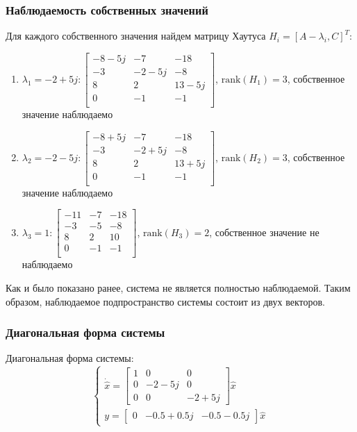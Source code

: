 \subsubsection{Наблюдаемость собственных значений}
Для каждого собственного значения найдем матрицу Хаутуса $H_i = [A - \lambda_i, C]^T$:
\begin{enumerate}
    \item $\lambda_1 = -2 + 5j: \begin{bmatrix}
        -8 - 5j  & -7  & -18 \\ 
        -3  & -2 - 5j  & -8 \\ 
        8  & 2  & 13 - 5j \\ 
        0  & -1  & -1 \\ 
        \end{bmatrix} $, $\text{rank}(H_1) = 3$, собственное значение наблюдаемо

    \item $\lambda_2 = -2 - 5j: \begin{bmatrix}
        -8 + 5j  & -7  & -18 \\ 
        -3  & -2 + 5j  & -8 \\ 
        8  & 2  & 13 + 5j \\ 
        0  & -1  & -1 \\ 
    \end{bmatrix}$, $\text{rank}(H_2) = 3$, собственное значение наблюдаемо

    \item $\lambda_3 = 1: \begin{bmatrix}
        -11  & -7  & -18 \\ 
        -3  & -5  & -8 \\ 
        8  & 2  & 10 \\ 
        0  & -1  & -1 \\ 
    \end{bmatrix}$, $\text{rank}(H_3) = 2$, собственное значение не наблюдаемо
    
\end{enumerate}

Как и было показано ранее, система не является полностью наблюдаемой. Таким образом, наблюдаемое подпространство системы состоит из двух векторов.

\subsubsection{Диагональная форма системы}
Диагональная форма системы:
\begin{equation}
    \begin{cases}
        \dot{\hat{x}} = \begin{bmatrix}
            1 & 0 & 0 \\
            0 & -2-5j & 0 \\
            0 & 0 & -2+5j
        \end{bmatrix} \hat{x} \\ 
        y = \begin{bmatrix}
            0 & -0.5+0.5j & -0.5-0.5j
        \end{bmatrix} \hat{x}
    \end{cases}
\end{equation}

